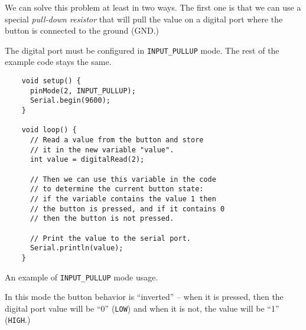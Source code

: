 \documentclass[../sparc.tex]{subfiles}
\begin{document}
We can solve this problem at least in two ways.  The first one is that we can
use a special \emph{pull-down resistor} that will pull the value on a digital
port where the button is connected to the ground (GND.)


The digital port must be configured in \texttt{INPUT_PULLUP} mode.  The
rest of the example code stays the same.

\begin{listing}[H]
  \begin{verbatim}
    void setup() {
      pinMode(2, INPUT_PULLUP);
      Serial.begin(9600);
    }

    void loop() {
      // Read a value from the button and store
      // it in the new variable "value".
      int value = digitalRead(2);

      // Then we can use this variable in the code
      // to determine the current button state:
      // if the variable contains the value 1 then
      // the button is pressed, and if it contains 0
      // then the button is not pressed.

      // Print the value to the serial port.
      Serial.println(value);
    }
  \end{verbatim}
  \caption{An example of \texttt{INPUT_PULLUP} mode usage.}
  \label{listing:game-dev-input-pullup-example}
\end{listing}

In this mode the button behavior is ``inverted'' -- when it is pressed, then the
digital port value will be ``0'' (\texttt{LOW}) and when it is not, the
value will be ``1'' (\texttt{HIGH}.)
\end{document}
